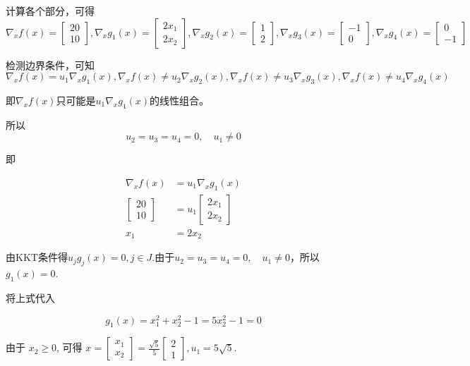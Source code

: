 计算各个部分，可得
$$ \nabla_{x} f(x)=\left[\begin{array}{c}20 \\ 10\end{array}\right], \nabla_{x} g_{1}(x)=\left[\begin{array}{c}2 x_{1} \\ 2 x_{2}\end{array}\right], \nabla_{x} g_{2}(x)=\left[\begin{array}{l}1 \\ 2\end{array}\right], \nabla_{x} g_{3}(x)=\left[\begin{array}{l}-1 \\ 0\end{array}\right], \nabla_{x} g_{4}(x)=\left[\begin{array}{l}0 \\ -1\end{array}\right]$$

检测边界条件，可知
$$ \nabla_{x} f(x)=u_{1} \nabla_{x} g_{1}(x), \nabla_{x} f(x) \neq u_{2} \nabla_{x} g_{2}(x), \nabla_{x} f(x) \neq u_{3} \nabla_{x} g_{3}(x), \nabla_{x} f(x) \neq u_{4} \nabla_{x} g_{4}(x) $$

即$\nabla_{x} f(x)$只可能是$u_{1} \nabla_{x} g_{1}(x)$的线性组合。

所以
$$ u_{2}=u_{3}=u_{4}=0, \quad u_{1} \neq 0 $$

即

$$
\begin{aligned}
    \nabla_{x} f(x)&=u_{1} \nabla_{x} g_{1}(x)\\
\left[\begin{array}{c}
20 \\
10
\end{array}\right]&=u_{1}\left[\begin{array}{c}
2 x_{1} \\
2 x_{2}
\end{array}\right]\\
x_{1}&=2 x_{2} 
\end{aligned}
$$

由KKT条件得$ u_{j} g_{j}(x)=0, j \in J $.由于$ u_{2}=u_{3}=u_{4}=0, \quad u_{1} \neq 0 $，所以$g_1(x) = 0$.


将上式代入

$$g_{1}(x)=x_{1}^{2}+x_{2}^{2}-1=5 x_{2}^{2}-1=0$$


由于 $ x_{2} \geq 0 $, 可得 $x = \left[\begin{array}{l}x_{1} \\ x_{2}\end{array}\right]=\frac{\sqrt{5}}{5}\left[\begin{array}{l}2 \\ 1\end{array}\right], u_{1}=5 \sqrt{5} $.

